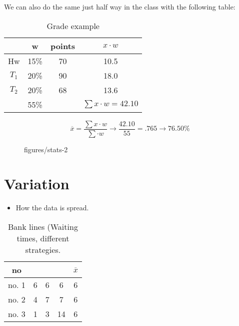 \documentclass{book}
\begin{document}
We can also do the same just half way in the class with the following table:

\begin{table}[htbp]
    \centering
    \begin{tabular}{c|c|c|c}
        \toprule
          & w & points & $x\cdot w$ \\
          \midrule
        Hw & 15\% & 70 & 10.5 \\
        $T_1$ & 20\%    & 90 & 18.0 \\
        $T_2$ & 20\%    & 68 & 13.6 \\
        \midrule
              & 55\%      &    & $\sum x\cdot w = 42.10 $ \\
              \bottomrule
    \end{tabular}
    \caption{Grade example}
\end{table}
\[ \overline{x} = \frac{\sum x\cdot w}{\sum \cdot w} \to \frac{42.10}{55} = .765 \to 76.50\% \] 


\begin{figure}[ht]
    \centering
    \caption{figures/stats-2}
    \label{fig:stats-2}
\end{figure}

\vspace{50pt}


\section{Variation}

\begin{itemize}
    \item How the data is spread.
\end{itemize}

\begin{table}[htbp]
    \centering
    \begin{tabular}{c|| c|c|c|c}
        no  &   &   &   & $\overline{x}$\\
        \toprule
        no. 1 & 6 & 6 & 6  & 6 \\
        no. 2 & 4 & 7 & 7  & 6 \\
        no. 3 & 1 & 3 & 14 & 6 \\
        \bottomrule
    \end{tabular}
    \caption{Bank lines (Waiting times, different strategies.}
\end{table}
\end{document}
